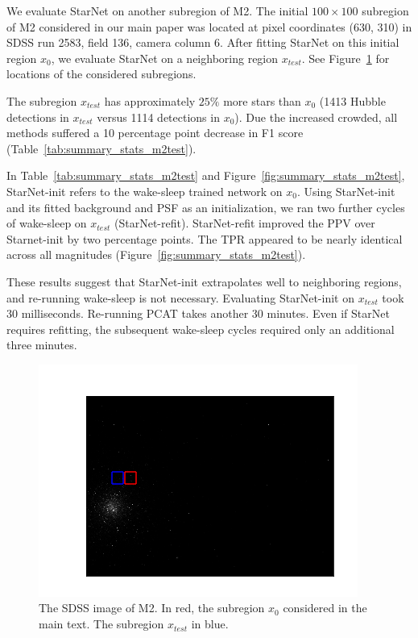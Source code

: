 We evaluate StarNet on another subregion of M2.
The initial $100\times100$ subregion of M2 considered in our main paper was located at pixel coordinates (630, 310) in SDSS run 2583, field 136, camera column 6. 
After fitting StarNet on this initial region $x_0$, we evaluate StarNet on a neighboring region $x_{test}$. See Figure~\ref{fig:marked_m2} for locations of the considered subregions. 

The subregion $x_{test}$ has approximately $25\%$ more stars than $x_0$ (1413 Hubble detections in $x_{test}$ versus 1114 detections in $x_0$). 
Due the increased crowded, all methods suffered a 10 percentage point decrease in F1 score (Table~\ref{tab:summary_stats_m2test}). 



In Table~\ref{tab:summary_stats_m2test} and Figure~\ref{fig:summary_stats_m2test},
StarNet-init refers to the wake-sleep trained network on $x_0$. 
Using StarNet-init and its fitted background and PSF as an initialization, we ran two further cycles of wake-sleep on $x_{test}$ (StarNet-refit). 
StarNet-refit improved the PPV over Starnet-init by two percentage points. 
The TPR appeared to be nearly identical across all magnitudes (Figure~\ref{fig:summary_stats_m2test}). 

These results suggest that StarNet-init extrapolates well to neighboring regions, and re-running wake-sleep is not necessary. 
Evaluating StarNet-init on $x_{test}$ took 30 milliseconds. 
Re-running PCAT takes another 30 minutes. 
Even if StarNet requires refitting, the subsequent wake-sleep cycles required only an additional three minutes. 

\begin{figure}[!ht]
    \centering
    \includegraphics{figures/m2_test/m2_regions.png}
    \caption{The SDSS image of M2. In red, the subregion $x_0$ considered in the main text. The subregion $x_{test}$ in blue. }
    \label{fig:marked_m2}
\end{figure}

